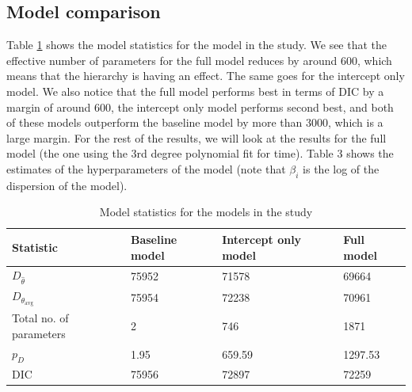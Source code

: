 \documentclass{article}\usepackage[]{graphicx}\usepackage[]{color}
\begin{document}
\subsection{Model comparison}
Table \ref{tab:DIC} shows the model statistics for the model in the study. We see that the effective number of parameters for the full model reduces by around 600, which means that the hierarchy is having an effect. The same goes for the intercept only model. We also notice that the full model performs best in terms of DIC by a margin of around 600, the intercept only model performs second best, and both of these models outperform the baseline model by more than 3000, which is a large margin. For the rest of the results, we will look at the results for the full model (the one using the 3rd degree polynomial fit for time). Table 3 shows the estimates of the hyperparameters of the model (note that $\beta_i$ is the log of the dispersion of the model).

\begin{table}[h]
    \centering
    \caption{Model statistics for the models in the study}
    \begin{tabular}{llll}
        \toprule
        \textbf{Statistic} & \textbf{Baseline model} & \textbf{Intercept only model} & \textbf{Full model} \\
        \midrule
        $D_{\hat{\theta}}$ & 75952 & 71578 & 69664 \\
        $D_{\theta_\text{avg}}$ & 75954 & 72238 & 70961 \\
        Total no. of parameters & 2 & 746 & 1871 \\
        $p_D$ & 1.95 & 659.59 & 1297.53 \\
        DIC & 75956 & 72897 & 72259 \\
        \bottomrule
    \end{tabular}
    \label{tab:DIC}
\end{table}
\end{document}
